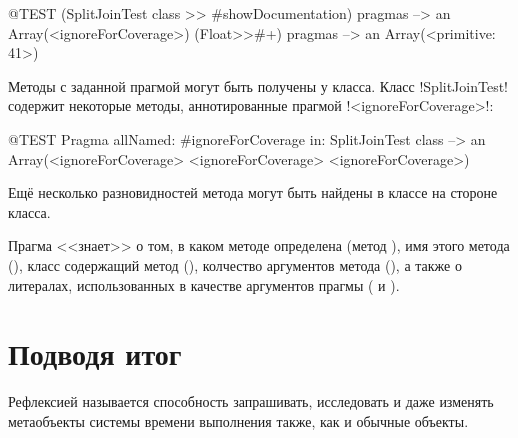 \documentclass[a4paper,10pt,twoside]{book}
\begin{document}
{\begin{code}{@TEST}
(SplitJoinTest class >> #showDocumentation) pragmas
  --> an Array(<ignoreForCoverage>)
(Float>>#+) pragmas --> an Array(<primitive: 41>)
\end{code}

Методы с заданной прагмой могут быть получены у класса. Класс \ct!SplitJoinTest! содержит некоторые методы, аннотированные прагмой \ct!<ignoreForCoverage>!:

\begin{code}{@TEST}
Pragma allNamed: #ignoreForCoverage in: SplitJoinTest class  --> an Array(<ignoreForCoverage> <ignoreForCoverage> <ignoreForCoverage>)
\end{code}

Ещё несколько разновидностей метода  могут быть найдены в классе  на стороне класса.

Прагма <<знает>> о том, в каком методе определена (метод ), имя этого метода (), класс содержащий метод (), колчество аргументов метода (), а также о литералах, использованных в качестве аргументов прагмы ( и ).


\section{Подводя итог}

Рефлексией называется способность запрашивать, исследовать и даже изменять метаобъекты системы времени выполнения также, как и обычные объекты.

}
\end{document}
